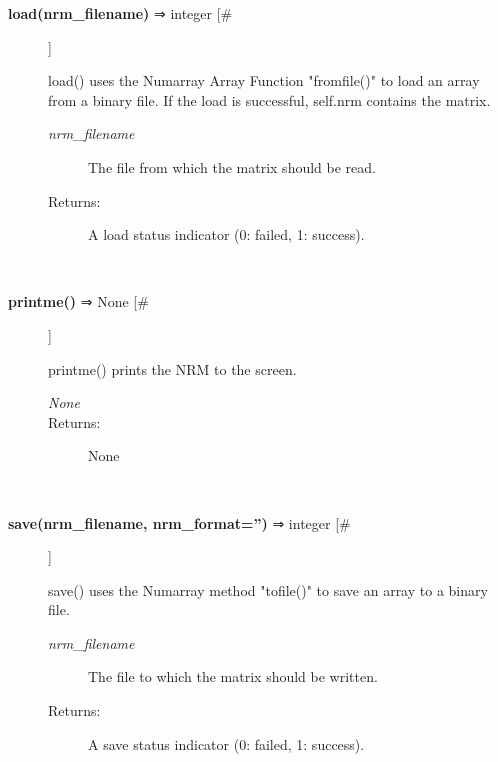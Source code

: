 \documentclass{article}
\begin{document}
\begin{description}
\item[\textbf{load(nrm\_filename)} ⇒ integer [\#]
]
\par load() uses the Numarray Array Function "fromfile()" to load an array from a
binary file.  If the load is successful, self.nrm contains the matrix.
\begin{description}
\item[\textit{nrm\_filename}
]
The file from which the matrix should be read.
\item[Returns:
]
A load status indicator (0: failed, 1: success).
\end{description}\\

\item[\textbf{printme()} ⇒ None [\#]
]
\par printme() prints the NRM to the screen.
\begin{description}
\item[\textit{None}
]

\item[Returns:
]
None
\end{description}\\

\item[\textbf{save(nrm\_filename, nrm\_format='')} ⇒ integer [\#]
]
\par save() uses the Numarray method "tofile()" to save an array to a binary file.
\begin{description}
\item[\textit{nrm\_filename}
]
The file to which the matrix should be written.
\item[Returns:
]
A save status indicator (0: failed, 1: success).
\end{description}\\

\end{description}
\end{document}
